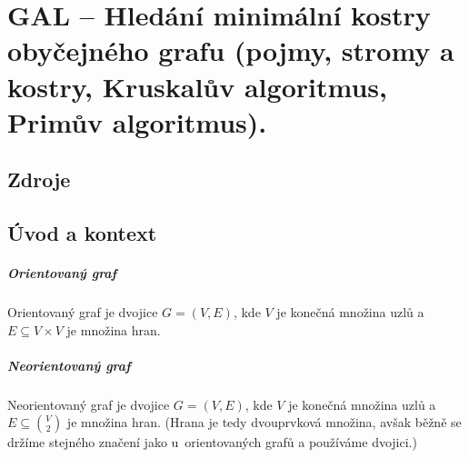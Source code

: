 

\graphicspath{{gal/hledani_minimalni_kostry/figures}}


\chapter{GAL -- Hledání minimální kostry obyčejného grafu (pojmy, stromy a kostry, Kruskalův algoritmus, Primův algoritmus).}


\section{Zdroje}

\begin{compactitem}
    \item {}
    \item {}
    \item {}
\end{compactitem}


\section{Úvod a kontext}

\paragraph*{Orientovaný graf} Orientovaný graf je dvojice $G = (V, E)$, kde $V$ je konečná množina uzlů a $E \subseteq V \times V$ je množina hran.

\paragraph*{Neorientovaný graf} Neorientovaný graf je dvojice $G = (V, E)$, kde $V$ je konečná množina uzlů a $E \subseteq \binom{V}{2}$ je množina hran. (Hrana je tedy dvouprvková množina, avšak běžně se držíme stejného značení jako u~orientovaných grafů a používáme dvojici.)

